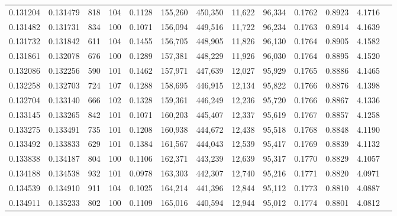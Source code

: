 \begin{tabular}{rrrrrrrrrrrrr}
0.131204 & 0.131479 &   818 & 104 &                                     0.1128 & 155,260 & 450,350 &  11,622 &  96,334 & 0.1762 & 0.8923 & 4.1716 \\
0.131482 & 0.131731 &   834 & 100 &                                     0.1071 & 156,094 & 449,516 &  11,722 &  96,234 & 0.1763 & 0.8914 & 4.1639 \\
0.131732 & 0.131842 &   611 & 104 &                                     0.1455 & 156,705 & 448,905 &  11,826 &  96,130 & 0.1764 & 0.8905 & 4.1582 \\
0.131861 & 0.132078 &   676 & 100 &                                     0.1289 & 157,381 & 448,229 &  11,926 &  96,030 & 0.1764 & 0.8895 & 4.1520 \\
0.132086 & 0.132256 &   590 & 101 &                                     0.1462 & 157,971 & 447,639 &  12,027 &  95,929 & 0.1765 & 0.8886 & 4.1465 \\
0.132258 & 0.132703 &   724 & 107 &                                     0.1288 & 158,695 & 446,915 &  12,134 &  95,822 & 0.1766 & 0.8876 & 4.1398 \\
0.132704 & 0.133140 &   666 & 102 &                                     0.1328 & 159,361 & 446,249 &  12,236 &  95,720 & 0.1766 & 0.8867 & 4.1336 \\
0.133145 & 0.133265 &   842 & 101 &                                     0.1071 & 160,203 & 445,407 &  12,337 &  95,619 & 0.1767 & 0.8857 & 4.1258 \\
0.133275 & 0.133491 &   735 & 101 &                                     0.1208 & 160,938 & 444,672 &  12,438 &  95,518 & 0.1768 & 0.8848 & 4.1190 \\
0.133492 & 0.133833 &   629 & 101 &                                     0.1384 & 161,567 & 444,043 &  12,539 &  95,417 & 0.1769 & 0.8839 & 4.1132 \\
0.133838 & 0.134187 &   804 & 100 &                                     0.1106 & 162,371 & 443,239 &  12,639 &  95,317 & 0.1770 & 0.8829 & 4.1057 \\
0.134188 & 0.134538 &   932 & 101 &                                     0.0978 & 163,303 & 442,307 &  12,740 &  95,216 & 0.1771 & 0.8820 & 4.0971 \\
0.134539 & 0.134910 &   911 & 104 &                                     0.1025 & 164,214 & 441,396 &  12,844 &  95,112 & 0.1773 & 0.8810 & 4.0887 \\
0.134911 & 0.135233 &   802 & 100 &                                     0.1109 & 165,016 & 440,594 &  12,944 &  95,012 & 0.1774 & 0.8801 & 4.0812 \\

\end{tabular}
